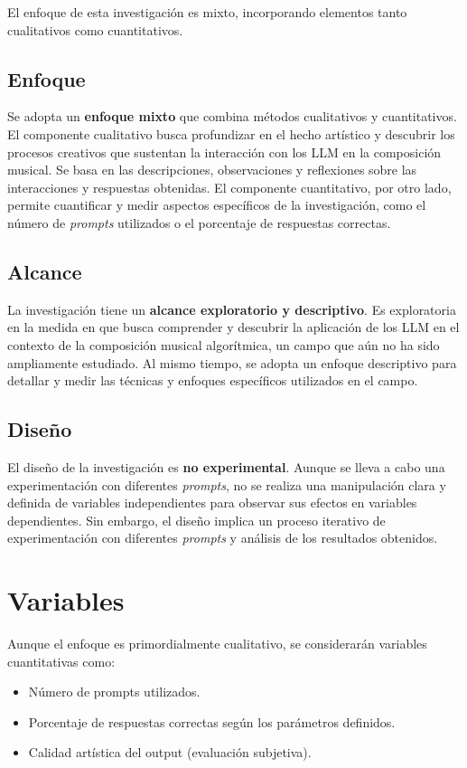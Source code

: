 El enfoque de esta investigación es mixto, incorporando elementos tanto cualitativos como cuantitativos. 

\subsection{Enfoque}
Se adopta un \textbf{enfoque mixto} que combina métodos cualitativos y cuantitativos. El componente cualitativo busca profundizar en el hecho artístico y descubrir los procesos creativos que sustentan la interacción con los LLM en la composición musical. Se basa en las descripciones, observaciones y reflexiones sobre las interacciones y respuestas obtenidas. El componente cuantitativo, por otro lado, permite cuantificar y medir aspectos específicos de la investigación, como el número de \textit{prompts} utilizados o el porcentaje de respuestas correctas.

\subsection{Alcance}
La investigación tiene un \textbf{alcance exploratorio y descriptivo}. Es exploratoria en la medida en que busca comprender y descubrir la aplicación de los LLM en el contexto de la composición musical algorítmica, un campo que aún no ha sido ampliamente estudiado. Al mismo tiempo, se adopta un enfoque descriptivo para detallar y medir las técnicas y enfoques específicos utilizados en el campo.

\subsection{Diseño}
El diseño de la investigación es \textbf{no experimental}. Aunque se lleva a cabo una experimentación con diferentes \textit{prompts}, no se realiza una manipulación clara y definida de variables independientes para observar sus efectos en variables dependientes. Sin embargo, el diseño implica un proceso iterativo de experimentación con diferentes \textit{prompts} y análisis de los resultados obtenidos.



\section{Variables}
Aunque el enfoque es primordialmente cualitativo, se considerarán variables cuantitativas como:
\begin{itemize}
    \item Número de prompts utilizados.
    \item Porcentaje de respuestas correctas según los parámetros definidos.
    \item Calidad artística del output (evaluación subjetiva).
\end{itemize}


